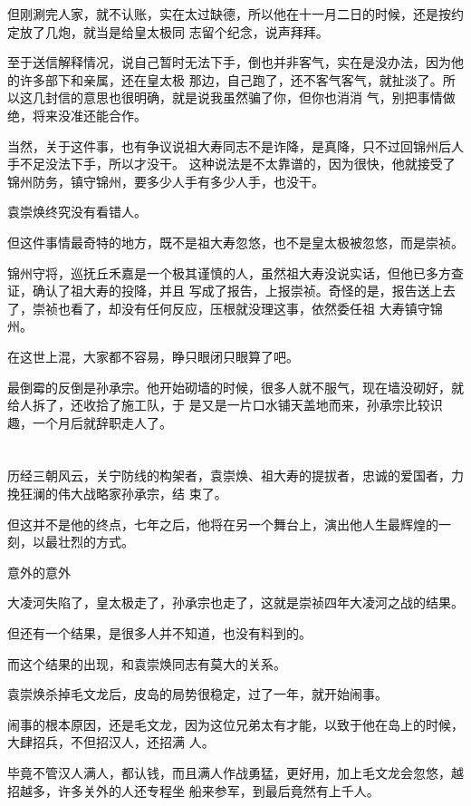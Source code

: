 \documentclass[11pt,a4paper,onecolumn]{article}
\begin{document}
但刚涮完人家，就不认账，实在太过缺德，所以他在十一月二日的时候，还是按约定放了几炮，就当是给皇太极同
志留个纪念，说声拜拜。

至于送信解释情况，说自己暂时无法下手，倒也并非客气，实在是没办法，因为他的许多部下和亲属，还在皇太极
那边，自己跑了，还不客气客气，就扯淡了。所以这几封信的意思也很明确，就是说我虽然骗了你，但你也消消
气，别把事情做绝，将来没准还能合作。

当然，关于这件事，也有争议说祖大寿同志不是诈降，是真降，只不过回锦州后人手不足没法下手，所以才没干。
这种说法是不太靠谱的，因为很快，他就接受了锦州防务，镇守锦州，要多少人手有多少人手，也没干。

袁崇焕终究没有看错人。

但这件事情最奇特的地方，既不是祖大寿忽悠，也不是皇太极被忽悠，而是崇祯。

锦州守将，巡抚丘禾嘉是一个极其谨慎的人，虽然祖大寿没说实话，但他已多方查证，确认了祖大寿的投降，并且
写成了报告，上报崇祯。奇怪的是，报告送上去了，崇祯也看了，却没有任何反应，压根就没理这事，依然委任祖
大寿镇守锦州。

在这世上混，大家都不容易，睁只眼闭只眼算了吧。

最倒霉的反倒是孙承宗。他开始砌墙的时候，很多人就不服气，现在墙没砌好，就给人拆了，还收拾了施工队，于
是又是一片口水铺天盖地而来，孙承宗比较识趣，一个月后就辞职走人了。

\section[\thesection]{}

历经三朝风云，关宁防线的构架者，袁崇焕、祖大寿的提拔者，忠诚的爱国者，力挽狂澜的伟大战略家孙承宗，结
束了。

但这并不是他的终点，七年之后，他将在另一个舞台上，演出他人生最辉煌的一刻，以最壮烈的方式。

意外的意外

大凌河失陷了，皇太极走了，孙承宗也走了，这就是崇祯四年大凌河之战的结果。

但还有一个结果，是很多人并不知道，也没有料到的。

而这个结果的出现，和袁崇焕同志有莫大的关系。

袁崇焕杀掉毛文龙后，皮岛的局势很稳定，过了一年，就开始闹事。

闹事的根本原因，还是毛文龙，因为这位兄弟太有才能，以致于他在岛上的时候，大肆招兵，不但招汉人，还招满
人。

毕竟不管汉人满人，都认钱，而且满人作战勇猛，更好用，加上毛文龙会忽悠，越招越多，许多关外的人还专程坐
船来参军，到最后竟然有上千人。
\end{document}

